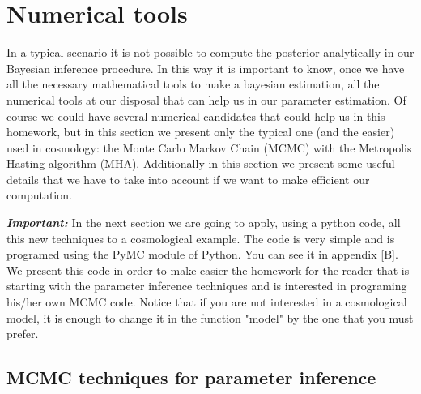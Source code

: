 \documentclass[onecolumn,           %
               showpacs,            %
               preprintnumbers,     %
               aps,                 %
               prl,          	    %
               letterpaper,             %
               superscriptaddress,      %
               nofootinbib,         %
               tightenlines,        %
               floats,floatfix      %
               ,usenatbib,
               ]{revtex4-1}
\begin{document}

%

\section{Numerical tools}

In a typical scenario it is not possible to compute the posterior analytically in our Bayesian inference procedure. In this way it is important to know, once we have all the necessary mathematical tools to make a bayesian estimation, all the numerical tools at our disposal that can help us in our parameter estimation. Of course we could have several numerical candidates that could help us in this homework, but in this section we present only the typical one (and the easier) used in cosmology: the Monte Carlo Markov Chain (MCMC) with the Metropolis Hasting algorithm (MHA). Additionally in this section we present some useful details that we have to take into account if we want to make efficient our computation. 

\textit{\textbf{Important:}} In the next section we are going to apply, using a python code, all this new techniques to a cosmological example. The code is very simple and is programed using the PyMC module of Python. You can see it in appendix [B]. We present this code in order to make easier the homework for the reader that is starting with the parameter inference techniques and is interested in programing his/her own MCMC code. Notice that if you are not interested in a cosmological model, it is enough to change it in the function "model" by the one that you must prefer. 

\subsection{MCMC techniques for parameter inference}
\end{document}
